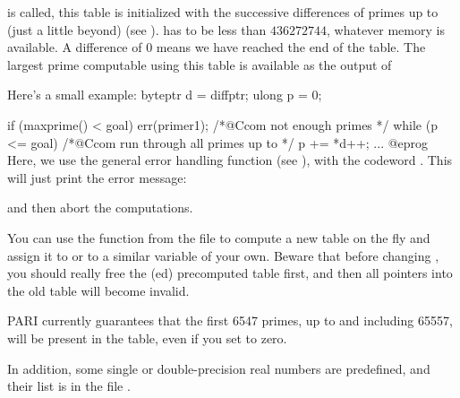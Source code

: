 
\noindent is called, this table is initialized with the successive
differences of primes up to (just a little beyond) 
(see ).  has to be less than $436272744$,
whatever memory is available. A difference of $0$ means we have reached the
end of the table. The largest prime computable using this table is
available as the output of


\noindent Here's a small example:
%
\bprog
byteptr d = diffptr;
ulong p = 0;

if (maxprime() < goal) err(primer1); /*@Ccom not enough primes */
while (p <= goal) /*@Ccom run through all primes up to  */
{
  p += *d++;
  ...
}
@eprog\noindent
Here, we use the general error handling function  (see
), with the codeword . This will just print
the error message:


\noindent and then abort the computations.

You can use the function  from the file  to
compute a new table on the fly and assign it to  or to a
similar variable of your own. Beware that before changing ,
you should really free the (ed) precomputed table first, and then
all pointers into the old table will become invalid.

PARI currently guarantees that the first 6547 primes, up to and including
65557, will be present in the table, even if you set  to zero.

In addition, some single or double-precision real numbers are predefined,
and their list is in the file .
\vfill\eject
